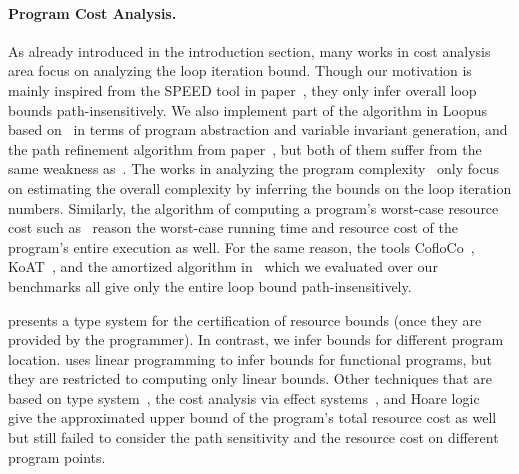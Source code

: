 \paragraph{Program Cost Analysis.}
As already introduced in the introduction section, many works in cost analysis area focus on analyzing the loop iteration bound.
Though our motivation is mainly inspired from the SPEED tool in paper~\cite{GulwaniZ10}, they only infer overall loop bounds path-insensitively.
We also implement part of the algorithm in Loopus based on~\cite{SinnZV17} in terms of program abstraction and variable invariant generation,
and the path refinement algorithm from paper~\cite{GulwaniJK09}, but both of them suffer from the same weakness as~\cite{GulwaniZ10}.
The works in analyzing the program complexity~\cite{GustafssonEL05, HumenbergerJK18} only focus on estimating 
the overall complexity 
by inferring the bounds on the loop iteration numbers.
Similarly, the algorithm of computing a program's worst-case resource cost
such as~\cite{AlbertAGP08, AliasDFG10} reason the worst-case running time and resource cost of the program's entire execution as well.
For the same reason, the tools CofloCo~\cite{Montoya17, Flores-MontoyaH14, Flores-Montoya16}, KoAT~\cite{BrockschmidtEFFG16, BrockschmidtEFFG14, FalkeKS12, FalkeKS11}, and the amortized algorithm in~\cite{LuCT21} which we evaluated over our benchmarks all give only the entire loop bound path-insensitively.

\cite{CraryW00} presents a type system for the certification of resource bounds (once they are provided by the programmer). In contrast, we infer bounds for different program location. 
\cite{JostHLH10} uses linear programming to infer bounds for functional programs, but they are restricted to computing only linear bounds.
Other techniques that are based on
type system~\cite{CicekBG0H17, RajaniG0021}, the cost analysis via effect systems~\cite{CicekBG0H17, RadicekBG0Z18, QuG019}, and Hoare logic~\cite{CarbonneauxHS15}
give the approximated upper bound of the program's total resource cost as well but still failed to consider the path sensitivity and the resource cost on different program points.

